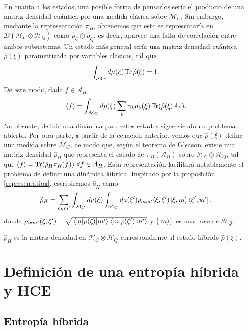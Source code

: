 \documentclass[openany, 11pt]{book}
\numberwithin{equation}{chapter}
\newcommand{\Hc}{\mathcal H_C}
\newcommand{\Hq}{\mathcal H_Q}
\newcommand{\Ah}{\mathcal A_H}
\newcommand{\Mc}{\mathcal M_C}
\begin{document}
En cuanto a los estados, una posible forma de pensarlos sería el producto de una matriz densidad cuántica por una medida clásica sobre $\Mc$. Sin embargo, mediante la representación $\pi_H$, obtenemos que esto se representaría en $\mathcal D(\Hc\otimes\Hq)$ como $\hat \rho_C\otimes\hat\rho_Q$, es decir, 
aparece una falta de correlación entre ambos subsistemas. Un estado más general sería una matriz densidad cuántica $\hat \rho(\xi)$ parametrizada por variables clásicas, tal que \begin{equation}
    \int_{\Mc}d\mu(\xi)\Tr\hat\rho(\xi) = 1.
\end{equation}De este modo, dado $f\in\Ah$, \begin{equation}
    \expval{f} = \int_{\Mc} d\mu(\xi) \sum_k \gamma_k a_k(\xi)\Tr(\hat \rho(\xi)A_k).
\end{equation}No obsnate, definir una dinámica para estos estados sigue siendo un problema abierto. Por otra parte, a partir de la ecuación anterior, vemos que $\hat\rho(\xi)$ define una medida sobre $\Mc$, de modo que, según el teorema de Gleason, existe una matriz densidad $\hat\rho_H$ que representa 
el estado de $\pi_H(\Ah)$ sobre $\Hc\otimes\Hq$, tal que $\expval{f} = \Tr(\hat\rho_H\pi_H(f)) \ \forall f\in\Ah$. Esta representación facilitará notablemente el problema de definir una dinámica híbrida. Inspirado por la proposición \ref{representation}, escribiremos $\hat\rho_H$ como\begin{equation}\label{changeofformalism}
    \hat\rho_H =\sum_{m,m'}\int_{\Mc}d\mu(\xi)\int_{\Mc}d\mu(\xi')\rho_{mm'}(\xi,\xi')\ket{\xi,m}\bra{\xi',m'},
\end{equation}donde $\rho_{mm'}(\xi,\xi') = \sqrt{\mel{m}{\rho(\xi)}{m'}\mel{m}{\rho(\xi')}{m'}}$ y $\{\ket{m}\}$ es una base de $\Hq$.

\begin{proposition}
    $\hat \rho_H$ es la matriz densidad en $\Hc\otimes\Hq$ correspondiente al estado híbrido $\hat\rho(\xi)$.
\end{proposition}


\chapter{Definición de una entropía híbrida y HCE}

\section{Entropía híbrida}
\end{document}
